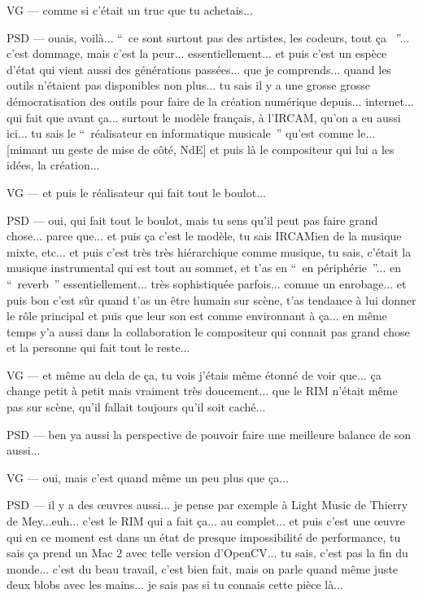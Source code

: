 VG — comme si c'était un truc que tu achetais...

PSD — ouais, voilà... “ ce sont surtout pas des artistes, les codeurs, tout ça  ”... c'est dommage, mais c'est la peur... essentiellement... et puis c'est un espèce d'état qui vient aussi des générations passées... que je comprends... quand les outils n'étaient pas disponibles non plus... tu sais il y a une grosse grosse démocratisation des outils pour faire de la création numérique depuis... internet... qui fait que avant ça... surtout le modèle français, à l'IRCAM, qu'on a eu aussi ici... tu sais le “ réalisateur en informatique musicale ” qu'est comme le... [mimant un geste de mise de côté, NdE] et puis là le compositeur qui lui a les idées, la création...

VG — et puis le réalisateur qui fait tout le boulot...

PSD — oui, qui fait tout le boulot, mais tu sens qu'il peut pas faire grand chose... parce que... et puis ça c'est le modèle, tu sais IRCAMien de la musique mixte, etc... et puis c'est très très hiérarchique comme musique, tu sais, c'était la musique instrumental qui est tout au sommet, et t'as en “ en périphérie ”... en “ reverb ” essentiellement... très sophistiquée parfois... comme un enrobage... et puis bon c'est sûr quand t'as un être humain sur scène, t'as tendance à lui donner le rôle principal et puis que leur son est comme environnant à ça... en même temps y'a aussi dans la collaboration le compositeur qui connait pas grand chose et la personne qui fait tout le reste...

VG — et même au dela de ça, tu vois j'étais même étonné de voir que... ça change petit à petit mais vraiment très doucement... que le RIM n'était même pas sur scène, qu'il fallait toujours qu'il soit caché...

PSD — ben ya aussi la perspective de pouvoir faire une meilleure balance de son aussi...

VG — oui, mais c'est quand même un peu plus que ça...

PSD — il y a des œuvres aussi... je pense par exemple à Light Music de Thierry de Mey...euh... c'est le RIM qui a fait ça... au complet... et puis c'est une œuvre qui en ce moment est dans un état de presque impossibilité de performance, tu sais ça prend un Mac 2 avec telle version d'OpenCV... tu sais, c'est pas la fin du monde... c'est du beau travail, c'est bien fait, mais on parle quand même juste deux blobs avec les mains... je sais pas si tu connais cette pièce là...

